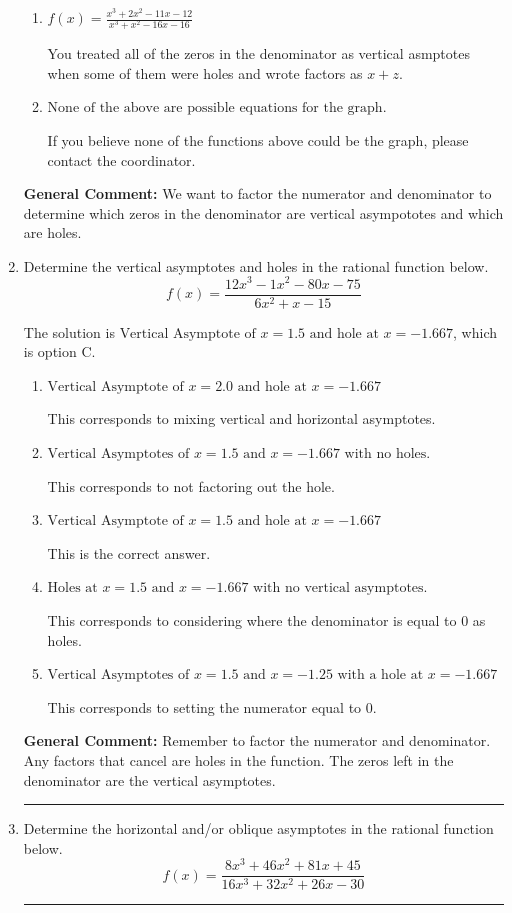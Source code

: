 \documentclass{extbook}[14pt]
\newcommand{\litem}[1]{\item #1

\rule{\textwidth}{0.4pt}}
\begin{document}
\begin{enumerate}
{\begin{enumerate}[label=\Alph*.]
You treated all of the zeros in the denominator as vertical asymptotes when some of them were holes!
\item \( f(x)=\frac{x^{3} +2 x^{2} -11 x -12}{x^{3} + x^{2} -16 x -16} \)

You treated all of the zeros in the denominator as vertical asmptotes when some of them were holes and wrote factors as $x+z$.
\item \( \text{None of the above are possible equations for the graph.} \)

If you believe none of the functions above could be the graph, please contact the coordinator.
\end{enumerate}

\textbf{General Comment:} We want to factor the numerator and denominator to determine which zeros in the denominator are vertical asympototes and which are holes.
}
\litem{
Determine the vertical asymptotes and holes in the rational function below.
\[ f(x) = \frac{12x^{3} -1 x^{2} -80 x -75}{6x^{2} +x -15} \]

The solution is \( \text{Vertical Asymptote of } x = 1.5 \text{ and hole at } x = -1.667 \), which is option C.\begin{enumerate}[label=\Alph*.]
\item \( \text{Vertical Asymptote of } x = 2.0 \text{ and hole at } x = -1.667 \)

This corresponds to mixing vertical and horizontal asymptotes.
\item \( \text{Vertical Asymptotes of } x = 1.5 \text{ and } x = -1.667 \text{ with no holes.} \)

This corresponds to not factoring out the hole.
\item \( \text{Vertical Asymptote of } x = 1.5 \text{ and hole at } x = -1.667 \)

This is the correct answer.
\item \( \text{Holes at } x = 1.5 \text{ and } x = -1.667 \text{ with no vertical asymptotes.} \)

This corresponds to considering where the denominator is equal to 0 as holes.
\item \( \text{Vertical Asymptotes of } x = 1.5 \text{ and } x = -1.25 \text{ with a hole at } x = -1.667 \)

This corresponds to setting the numerator equal to 0.
\end{enumerate}

\textbf{General Comment:} Remember to factor the numerator and denominator. Any factors that cancel are holes in the function. The zeros left in the denominator are the vertical asymptotes.
}
\litem{
Determine the horizontal and/or oblique asymptotes in the rational function below.
\[ f(x) = \frac{8x^{3} +46 x^{2} +81 x + 45}{16x^{3} +32 x^{2} +26 x -30} \]

}
\end{enumerate}
\end{document}
